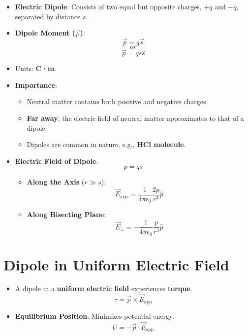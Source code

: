 \documentclass{article}
\begin{document}
\begin{itemize}
    \item \textbf{Electric Dipole}: Consists of two equal but opposite charges, \(+q\) and \(-q\), separated by distance \(s\).
    \item \textbf{Dipole Moment (\(\vec{p}\))}:
    \[
    \vec{p} = q \vec{s}
    \]
    \[
    or
    \]
    \[
    \vec{p} = qs\hat{s}
    \]
    \item Units: \textbf{C·m}.
    \item \textbf{Importance}:
    \begin{itemize}
        \item Neutral matter contains both positive and negative charges.
        \item \textbf{Far away}, the electric field of neutral matter approximates to that of a dipole.
        \item Dipoles are common in nature, e.g., \textbf{HCl molecule}.
    \end{itemize}
    \item \textbf{Electric Field of Dipole}:
    \[
        p = qs
    \]
    \begin{itemize}
        \item \textbf{Along the Axis} (\(r \gg s\)):
        \[
        \vec{E}_{\text{axis}} = \frac{1}{4\pi\epsilon_0} \frac{2p}{r^3} \hat{p}
        \]
        \item \textbf{Along Bisecting Plane}:
        \[
        \vec{E}_{\perp} = -\frac{1}{4\pi\epsilon_0} \frac{p}{r^3} \hat{p}
        \]
    \end{itemize}
\end{itemize}

\section*{Dipole in Uniform Electric Field}
\begin{itemize}
    \item A dipole in a \textbf{uniform electric field} experiences \textbf{torque}.
    \[
    \tau = \vec{p} \times \vec{E}_{\text{app}}
    \]
    \item \textbf{Equilibrium Position}: Minimizes potential energy.
    \[
    U = -\vec{p} \cdot \vec{E}_{\text{app}}
    \]
\end{itemize}
\end{document}
